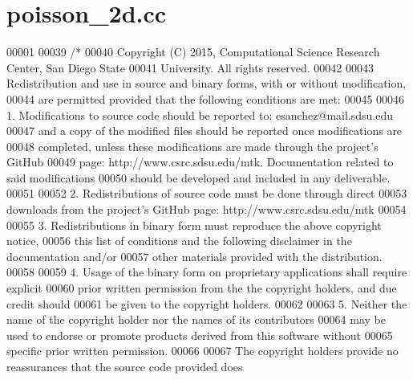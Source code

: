 \hypertarget{poisson__2d_8cc_source}{\section{poisson\+\_\+2d.\+cc}
\label{poisson__2d_8cc_source}
}

\begin{DoxyCode}
00001 
00039 \textcolor{comment}{/*}
00040 \textcolor{comment}{Copyright (C) 2015, Computational Science Research Center, San Diego State}
00041 \textcolor{comment}{University. All rights reserved.}
00042 \textcolor{comment}{}
00043 \textcolor{comment}{Redistribution and use in source and binary forms, with or without modification,}
00044 \textcolor{comment}{are permitted provided that the following conditions are met:}
00045 \textcolor{comment}{}
00046 \textcolor{comment}{1. Modifications to source code should be reported to: esanchez@mail.sdsu.edu}
00047 \textcolor{comment}{and a copy of the modified files should be reported once modifications are}
00048 \textcolor{comment}{completed, unless these modifications are made through the project's GitHub}
00049 \textcolor{comment}{page: http://www.csrc.sdsu.edu/mtk. Documentation related to said modifications}
00050 \textcolor{comment}{should be developed and included in any deliverable.}
00051 \textcolor{comment}{}
00052 \textcolor{comment}{2. Redistributions of source code must be done through direct}
00053 \textcolor{comment}{downloads from the project's GitHub page: http://www.csrc.sdsu.edu/mtk}
00054 \textcolor{comment}{}
00055 \textcolor{comment}{3. Redistributions in binary form must reproduce the above copyright notice,}
00056 \textcolor{comment}{this list of conditions and the following disclaimer in the documentation and/or}
00057 \textcolor{comment}{other materials provided with the distribution.}
00058 \textcolor{comment}{}
00059 \textcolor{comment}{4. Usage of the binary form on proprietary applications shall require explicit}
00060 \textcolor{comment}{prior written permission from the the copyright holders, and due credit should}
00061 \textcolor{comment}{be given to the copyright holders.}
00062 \textcolor{comment}{}
00063 \textcolor{comment}{5. Neither the name of the copyright holder nor the names of its contributors}
00064 \textcolor{comment}{may be used to endorse or promote products derived from this software without}
00065 \textcolor{comment}{specific prior written permission.}
00066 \textcolor{comment}{}
00067 \textcolor{comment}{The copyright holders provide no reassurances that the source code provided does}

\end{DoxyCode}
